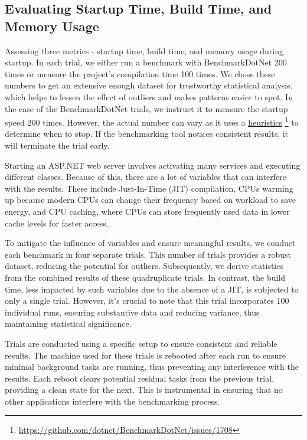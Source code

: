 \subsection{Evaluating Startup Time, Build Time, and Memory Usage}

Assessing three metrics - startup time, build time, and memory usage during startup. In each trial, we either run a benchmark with BenchmarkDotNet 200 times or measure the project's compilation time 100 times. We chose these numbers to get an extensive enough dataset for trustworthy statistical analysis, which helps to lessen the effect of outliers and makes patterns easier to spot. In the case of the BenchmarkDotNet trials, we instruct it to measure the startup speed 200 times. However, the actual number can vary as it uses a \href{https://github.com/dotnet/BenchmarkDotNet/issues/1708}{heuristics} \footnote{\url{https://github.com/dotnet/BenchmarkDotNet/issues/1708}} to determine when to stop. If the benchmarking tool notices consistent results, it will terminate the trial early.

Starting an ASP.NET web server involves activating many services and executing different classes. Because of this, there are a lot of variables that can interfere with the results. These include Just-In-Time (JIT) compilation, CPUs warming up because modern CPUs can change their frequency based on workload to save energy, and CPU caching, where CPUs can store frequently used data in lower cache levels for faster access.

To mitigate the influence of variables and ensure meaningful results, we conduct each benchmark in four separate trials. This number of trials provides a robust dataset, reducing the potential for outliers. Subsequently, we derive statistics from the combined results of these quadruplicate trials. In contrast, the build time, less impacted by such variables due to the absence of a JIT, is subjected to only a single trial. However, it's crucial to note that this trial incorporates 100 individual runs, ensuring substantive data and reducing variance, thus maintaining statistical significance.

Trials are conducted using a specific setup to ensure consistent and reliable results. The machine used for these trials is rebooted after each run to ensure minimal background tasks are running, thus preventing any interference with the results. Each reboot clears potential residual tasks from the previous trial, providing a clean state for the next. This is instrumental in ensuring that no other applications interfere with the benchmarking process.

